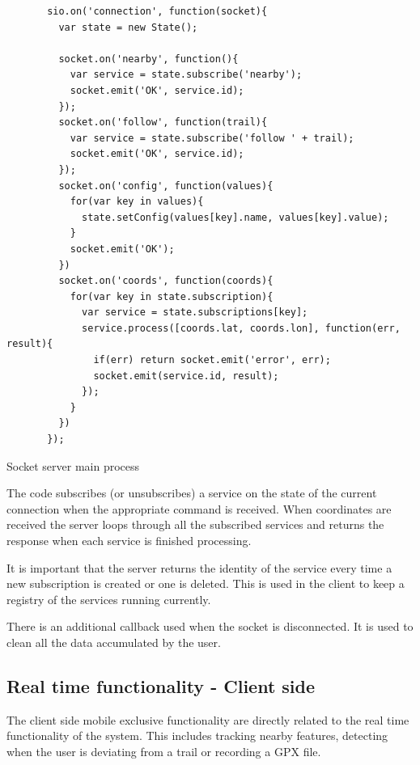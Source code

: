 \begin{listing}[ht]\centering
  \begin{minipage}{.8\textwidth}
    \begin{verbatim}
       sio.on('connection', function(socket){
         var state = new State();
         
         socket.on('nearby', function(){
           var service = state.subscribe('nearby'); 
           socket.emit('OK', service.id);
         });
         socket.on('follow', function(trail){
           var service = state.subscribe('follow ' + trail);
           socket.emit('OK', service.id);
         });
         socket.on('config', function(values){
           for(var key in values){
             state.setConfig(values[key].name, values[key].value);
           }
           socket.emit('OK');
         })
         socket.on('coords', function(coords){
           for(var key in state.subscription){
             var service = state.subscriptions[key];
             service.process([coords.lat, coords.lon], function(err, result){
               if(err) return socket.emit('error', err);
               socket.emit(service.id, result);
             });
           }
         })
       });
    \end{verbatim}
  \end{minipage}
  \caption{Socket server main process}\label{lst:socket}
\end{listing}

The code subscribes (or unsubscribes) a service on the state of the current connection when the appropriate command is received. When coordinates are received the server loops through all the subscribed services and returns the response when each service is finished processing.

It is important that the server returns the identity of the service every time a new subscription is created or one is deleted. This is used in the client to keep a registry of the services running currently.

There is an additional callback used when the socket is disconnected. It is used to clean all the data accumulated by the user.

\subsection{Real time functionality - Client side}

The client side mobile exclusive functionality are directly related to the real time functionality of the system. This includes tracking nearby features, detecting when the user is deviating from a trail or recording a GPX file.

